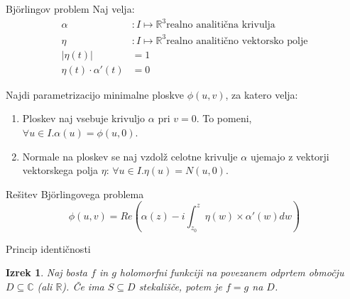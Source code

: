 \documentclass{beamer}
\newtheorem{izrek}{Izrek}
\newcommand{\R}{\mathbb R}
\begin{document}
    \begin{frame}{Björlingov problem}
        Naj velja:
        \begin{align*}
            \alpha &: I \mapsto \R^3 \text{realno analitična krivulja} \\
            \eta &: I \mapsto \R^3 \text{realno analitično vektorsko polje} \\
            \left\lvert \eta (t) \right\rvert &= 1 \\
            \eta (t) \cdot \alpha' (t) &= 0
        \end{align*}

        Najdi parametrizacijo minimalne ploskve $\phi (u, v)$, za katero velja:
        \begin{enumerate}
            \item Ploskev naj vsebuje krivuljo $\alpha$ pri $v = 0$. To pomeni, $\forall u \in I. \alpha (u) = \phi (u, 0)$.
            \item Normale na ploskev se naj vzdolž celotne krivulje $\alpha$ ujemajo z vektorji vektorskega polja $\eta$: 
            $\forall u \in I. \eta (u) = N(u, 0)$.
        \end{enumerate}
    \end{frame}


    \begin{frame}{Rešitev Björlingovega problema}
        $$ \phi (u, v) = Re \left( \alpha (z) - i \int_{z_0}^{z} \eta (w) \times \alpha' (w) dw \right) $$
    \end{frame}


    \begin{frame}{Princip identičnosti}
        \begin{izrek}
            Naj bosta $f$ in $g$ holomorfni funkciji na povezanem odprtem območju $D \subseteq \mathbb{C}$ (ali $\mathbb{R}$).
            Če ima $S \subseteq D$ stekališče, potem je $f = g$ na $D$.
        \end{izrek}
    \end{frame}

\end{document}
